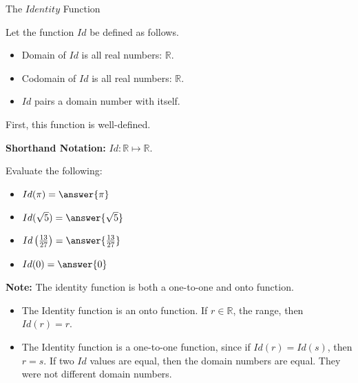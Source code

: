 \documentclass{ximera}
\begin{document}
\begin{example} The  $Identity$ Function 

Let the function $Id$ be defined as follows.


\begin{itemize}
\item Domain of $Id$ is all real numbers: $\mathbb{R}$.
\item Codomain of $Id$ is all real numbers: $\mathbb{R}$.
\item $Id$ pairs a domain number with itself.
\end{itemize}


First, this function is well-defined.


\textbf{Shorthand Notation: } $Id: \mathbb{R} \mapsto \mathbb{R}$.

\begin{question} 


Evaluate the following:

\begin{itemize}
	\item $Id(\pi) = \answer{\pi}$
	\item $Id(\sqrt{5}) = \answer{\sqrt{5}}$
	\item $Id\left(\frac{13}{27}\right) = \answer{\frac{13}{27}}$
	\item $Id(0) = \answer{0}$
\end{itemize}

\end{question}



\textbf{Note:} The identity function is both a one-to-one and onto function.

\begin{itemize}
\item The Identity function is an onto function.  If $r \in \mathbb{R}$, the range, then $Id(r) = r$. 
\item The Identity function is a one-to-one function, since if $Id(r)=Id(s)$, then $r = s$.  If two $Id$ values are equal, then the domain numbers are equal. They were not different domain numbers.
\end{itemize}




\end{example}
\end{document}
